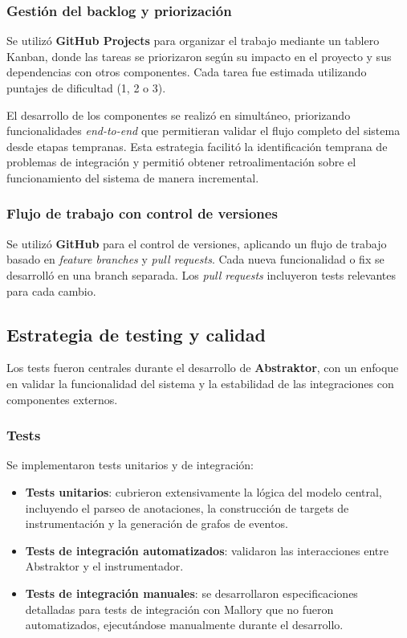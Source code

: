 \documentclass[12pt]{article}
\begin{document}
\subsubsection{Gestión del backlog y priorización}

Se utilizó \textbf{GitHub Projects} para organizar el trabajo mediante un tablero Kanban, donde las tareas se priorizaron según su impacto en el proyecto y sus dependencias con otros componentes. Cada tarea fue estimada utilizando puntajes de dificultad (1, 2 o 3).

El desarrollo de los componentes se realizó en simultáneo, priorizando funcionalidades \textit{end-to-end} que permitieran validar el flujo completo del sistema desde etapas tempranas. Esta estrategia facilitó la identificación temprana de problemas de integración y permitió obtener retroalimentación sobre el funcionamiento del sistema de manera incremental.

\subsubsection{Flujo de trabajo con control de versiones}

Se utilizó \textbf{GitHub} para el control de versiones, aplicando un flujo de trabajo basado en \textit{feature branches} y \textit{pull requests}. Cada nueva funcionalidad o fix se desarrolló en una branch separada. Los \textit{pull requests} incluyeron tests relevantes para cada cambio.

\subsection{Estrategia de testing y calidad}

Los tests fueron centrales durante el desarrollo de \textbf{Abstraktor}, con un enfoque en validar la funcionalidad del sistema y la estabilidad de las integraciones con componentes externos.

\subsubsection{Tests}

Se implementaron tests unitarios y de integración:

\begin{itemize}
    \item \textbf{Tests unitarios}: cubrieron extensivamente la lógica del modelo central, incluyendo el parseo de anotaciones, la construcción de targets de instrumentación y la generación de grafos de eventos.
    \item \textbf{Tests de integración automatizados}: validaron las interacciones entre Abstraktor y el instrumentador.
    \item \textbf{Tests de integración manuales}: se desarrollaron especificaciones detalladas para tests de integración con Mallory que no fueron automatizados, ejecutándose manualmente durante el desarrollo.
\end{itemize}
\end{document}
